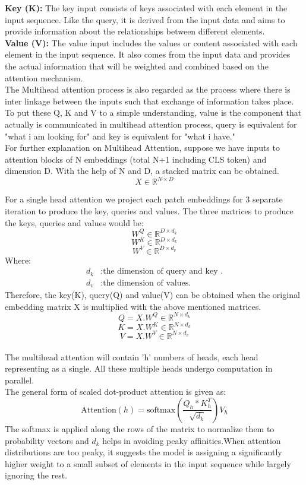 \textbf{Key (K):} The key input consists of keys associated with each element in the input sequence. Like the query, it is derived from the input data and aims to provide information about the relationships between different elements.\\

\textbf{Value (V):} The value input includes the values or content associated with each element in the input sequence. It also comes from the input data and provides the actual information that will be weighted and combined based on the attention mechanism.\\

The Multihead attention process is also regarded as the process where there is inter linkage between the inputs such that exchange of information takes place. To put these Q, K and V to a simple understanding, value is the component that actually is communicated in multihead attention process, query is equivalent for "what i am looking for" and key is equivalent for "what i have."\\

For further explanation  on Multihead Attention, suppose we have inputs to attention blocks of N embeddings (total N+1 including CLS token) and dimension D. With the help of N and D, a stacked matrix can be obtained.
\[ X \in \mathbb{R}^{N \times D}\] 

For a single head attention we project each patch embeddings for 3 separate iteration to produce the key, queries and values. The three matrices to produce the keys, queries and values would be:
\[ W^Q \in \mathbb{R}^{D\times d_k}\] 
\[ W^K \in \mathbb{R}^{D \times d_k}\] 
\[ W^V \in \mathbb{R}^{D \times d_v}\] 
Where:
\begin{align*}
    d_k & : \text{the dimension of query and key .} \\
    d_v & : \text{the dimension of values.}
\end{align*}
Therefore, the key(K), query(Q) and value(V) can be obtained when the original embedding matrix X is multiplied with the above mentioned matrices.
\[Q = X.W^Q \in \mathbb{R}^{N\times d_k}\] 
\[K = X.W^K \in \mathbb{R}^{N\times d_k}\] 
\[V = X.W^V \in \mathbb{R}^{N\times d_v}\] \\

The multihead attention will contain 'h' numbers of heads, each head representing as a single. All these multiple heads undergo computation in parallel. \\

The general form of  scaled dot-product attention is given as:
\[\text{Attention}(h) = \text{softmax}\left(\frac{Q_h * K_h ^T}{\sqrt{d_k}}\right) V_h\]
The softmax is applied along the rows of the matrix to normalize them to probability vectors and $d_k$ helps in avoiding peaky affinities.When attention distributions are too peaky, it suggests the model is assigning a significantly higher weight to a small subset of elements in the input sequence while largely ignoring the rest.\\

